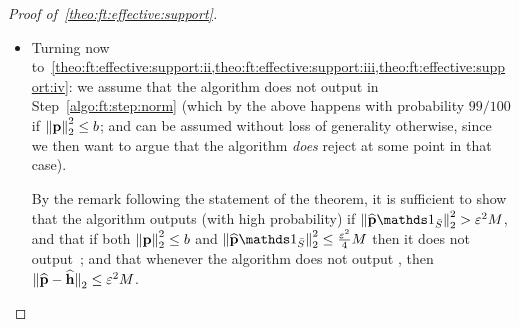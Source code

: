 \begin{proof}[Proof of~\cref{theo:ft:effective:support}]
\begin{itemize}
Moreover, if $\normtwo{\q}^2 \leq b$, then the same analysis shows that
\[
    \Pr[ X > \frac{3}{2}m^2b ] \leq \Pr\left[ \abs{ X - \shortexpect[ X ] } > \frac{1}{2}\shortexpect[ X ] \right]
    \leq 4\frac{\var[ X ]}{\shortexpect[ X ]^2} \leq \frac{1}{100}
\]
and with probability at least $1-\frac{1}{100}$ the algorithm does not output \reject in Step~\ref{algo:ft:step:norm}.

  \item Turning now to~\cref{theo:ft:effective:support:ii,theo:ft:effective:support:iii,theo:ft:effective:support:iv}: we assume that the algorithm does not output \reject in Step~\ref{algo:ft:step:norm} (which by the above happens with probability $99/100$ if $\normtwo{\q}^2 \leq b$; and can be assumed without loss of generality otherwise, since we then want to argue that the algorithm \emph{does} reject at some point in that case).
  
    By the remark following the statement of the theorem, it is sufficient to show that the algorithm outputs \reject (with high probability) if $\normtwo{\fourier{\q}\indicSet{\bar{S}}}^2 > \eps^2 M$, and that if both $\normtwo{\q}^2 \leq b$ and $\normtwo{\fourier{\q}\indicSet{\bar{S}}}^2 \leq \frac{\eps^2}{4}M$ then it does not output~\reject; and that whenever the algorithm does not output \reject, then ${\lVert\widehat{\mathbf{p}}-\widehat{\mathbf{h}}{\rVert}}_2 \leq \varepsilon^2 M$.
    

\end{itemize}
\end{proof}
